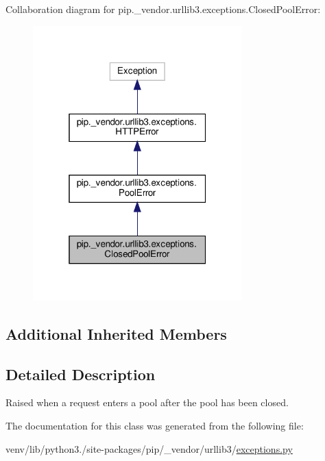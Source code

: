 Collaboration diagram for pip.\+\_\+vendor.\+urllib3.\+exceptions.\+Closed\+Pool\+Error\+:
\nopagebreak
\begin{figure}[H]
\begin{center}
\leavevmode
\includegraphics[width=229pt]{classpip_1_1__vendor_1_1urllib3_1_1exceptions_1_1ClosedPoolError__coll__graph}
\end{center}
\end{figure}
\subsection*{Additional Inherited Members}


\subsection{Detailed Description}
\begin{DoxyVerb}Raised when a request enters a pool after the pool has been closed.\end{DoxyVerb}
 

The documentation for this class was generated from the following file\+:\begin{DoxyCompactItemize}
\item 
venv/lib/python3./site-\/packages/pip/\+\_\+vendor/urllib3/\hyperlink{pip_2__vendor_2urllib3_2exceptions_8py}{exceptions.\+py}\end{DoxyCompactItemize}
